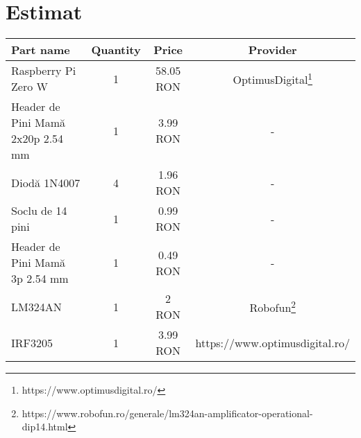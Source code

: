 \section {Estimat}
\begin{minipage}{\textwidth}
  \centering
  \begin{tabular}{ lccc } 
    \midrule
    Part name & Quantity & Price & Provider \\
    \midrule
    \midrule
    Raspberry Pi Zero W & 1 & 58.05 RON & OptimusDigital\footnote{https://www.optimusdigital.ro/} \\

    Header de Pini Mamă 2x20p 2.54 mm & 1 & 3.99 RON & -\\ 

    Diodă 1N4007 & 4 & 1.96 RON & -\\ 

    Soclu de 14 pini & 1 & 0.99 RON & -\\ 

    Header de Pini Mamă 3p 2.54 mm & 1 & 0.49 RON & -\\ 

    LM324AN & 1 & 2 RON & Robofun\footnote{https://www.robofun.ro/generale/lm324an-amplificator-operational-dip14.html}\\ 

    IRF3205 & 1 & 3.99 RON & https://www.optimusdigital.ro/\\ 
    \midrule
  \end{tabular}
\end{minipage}

